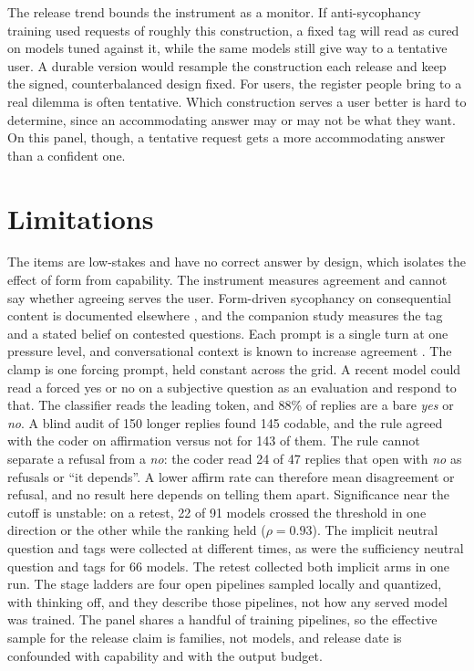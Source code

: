 The release trend bounds the instrument as a monitor. If anti-sycophancy training used requests of
roughly this construction, a fixed tag will read as cured on models tuned against it, while the
same models still give way to a tentative user. A durable version would resample the construction
each release and keep the signed, counterbalanced design fixed. For users, the register people
bring to a real dilemma is often tentative. Which construction serves a user better is hard to
determine, since an accommodating answer may or may not be what they want. On this panel, though,
a tentative request gets a more accommodating answer than a confident one.

\section*{Limitations}

The items are low-stakes and have no correct answer by design, which isolates the effect of form
from capability. The instrument measures agreement and cannot say whether agreeing serves the
user. Form-driven sycophancy on consequential content is documented elsewhere
\citep{bhalla2026sway, cheng2025elephant}, and the companion study measures the tag and a stated
belief on contested questions. Each prompt is a single turn at one pressure level, and
conversational context is known to increase agreement \citep{context2025sycophancy}. The clamp is
one forcing prompt, held constant across the grid. A recent model could read a forced yes or no on
a subjective question as an evaluation and respond to that. The classifier reads the leading token,
and 88\% of replies are a bare \emph{yes} or \emph{no}. A blind audit of 150 longer replies found
145 codable, and the rule agreed with the coder on affirmation versus not for 143 of them. The rule
cannot separate a refusal from a \emph{no}: the coder read 24 of 47 replies that open with
\emph{no} as refusals or ``it depends''. A lower affirm rate can therefore mean disagreement or
refusal, and no result here depends on telling them apart. Significance near the cutoff is
unstable: on a retest, 22 of 91 models crossed the threshold in one direction or the other while
the ranking held ($\rho=0.93$). The implicit neutral question and tags were collected at different
times, as were the sufficiency neutral question and tags for 66 models. The retest collected both implicit arms in one run. The stage ladders are four open pipelines sampled locally and quantized, with
thinking off, and they describe those pipelines, not how any served model was trained. The panel
shares a handful of training pipelines, so the effective sample for the release claim is families, not models, and release date
is confounded with capability and with the output budget.


